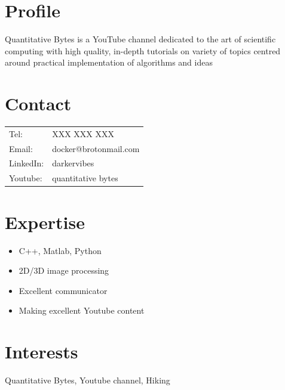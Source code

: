\documentclass[11pt,oneside,a4paper,titlepage]{article}
\begin{document}
\begin{tcolorbox}
	\begin{minipage}[t]{8cm}
		\vspace*{-0.5cm}
		\begin{tcolorbox}[grow to left by=0.6cm,colback=gray!25,colframe=white]
			\section*{Profile}
			Quantitative Bytes is a YouTube channel dedicated to the art of scientific computing with high quality, in-depth tutorials on variety of topics centred around practical implementation of algorithms and ideas
			\section*{Contact}
			\begin{tabular}{l l}
				Tel: & XXX XXX XXX \\
				Email: & docker@brotonmail.com \\
				LinkedIn: & darkervibes \\
				Youtube: & quantitative bytes
			\end{tabular}
			\section*{Expertise}
			\begin{itemize}
				\item {C++, Matlab, Python}
				\item  2D/3D image processing
				\item Excellent communicator
				\item Making excellent Youtube content
			\end{itemize}
			\section*{Interests}
			Quantitative Bytes,
			Youtube channel, Hiking
		\end{tcolorbox}
	\end{minipage}	

	\begin{minipage}[t]{11cm}
		\begin{tcolorbox}[grow to right by= 0.75cm,colback=white,colframe=white]
			

\end{tcolorbox}
\end{minipage}
\end{tcolorbox}
\end{document}
